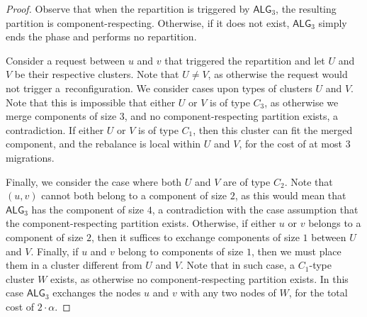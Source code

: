 \documentclass[manuscript,screen=true]{acmart}
\newcommand{\TAlg}{{\ensuremath{\textsf{ALG}_{3}}}\xspace} %
\begin{document}
\begin{proof}
  Observe that when the repartition is triggered by \TAlg, the resulting partition is component-respecting.
  Otherwise, if it does not exist, \TAlg simply ends the phase and performs no repartition.

  
    Consider a request between $u$ and $v$ that triggered the repartition and let $U$ and $V$ be their respective clusters.
    Note that $U\neq V$, as otherwise the request would not trigger a~reconfiguration.
    We consider cases upon types of clusters $U$ and $V$.
    Note that this is impossible that either $U$ or $V$ is of type $C_3$, as otherwise we merge components of size $3$, and no component-respecting partition exists, a contradiction.
    If either $U$ or $V$ is of type $C_1$, then this cluster can fit the merged component, and the rebalance is local within $U$ and $V$, for the cost of at most $3$ migrations.
  
    Finally, we consider the case where both $U$ and $V$ are of type $C_2$. Note that $(u,v)$ cannot both belong to a component of size $2$, as this would mean that \TAlg has the component of size $4$, a contradiction with the case assumption that the component-respecting partition exists. 
    Otherwise, if either $u$ or $v$ belongs to a component of size $2$, then it suffices to exchange components of size $1$ between $U$ and $V$.
    Finally, if $u$ and $v$ belong to components of size $1$, then we must place them in a cluster different from $U$ and $V$.
    Note that in such case, a $C_1$-type cluster $W$ exists, as otherwise no component-respecting partition exists. In this case \TAlg exchanges the nodes $u$ and $v$ with any two nodes of $W$, for the total cost of $2\cdot \alpha$.
\end{proof}
\end{document}
